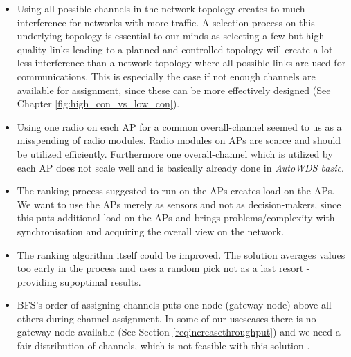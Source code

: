     \begin{itemize}
      \item Using all possible channels in the network topology creates to much interference for networks with more traffic.
	A selection process on this underlying topology is essential to our minds as selecting a few but high quality links
	leading to a planned and controlled topology will create a lot less interference than a network topology where all possible 
	links are used for communications. This is especially the case if not enough channels are available for assignment, since 
	these can be more effectively designed (See Chapter \ref{fig:high_con_vs_low_con}).
	\label{topologypreservingdealbreaker}
	
      \item Using one radio on each \ac{AP} for a common overall-channel seemed to us as a misspending of radio modules.
	Radio modules on APs are scarce and should be utilized efficiently. 
	Furthermore one overall-channel which is utilized by each \ac{AP} does not scale well and is basically already done in \textit{AutoWDS basic}.
	
      \item The ranking process suggested to run on the APs creates load on the APs.
	We want to use the APs merely as sensors and not as decision-makers, 
	since this puts additional load on the APs and brings problems/complexity with synchronisation and
	acquiring the overall view on the network.
	
      \item The ranking algorithm itself could be improved. 
	The solution averages values too early in the process and uses a random pick not as a last resort - providing supoptimal results.
	
      \item \ac{BFS}'s order of assigning channels puts one node (gateway-node) above all others during channel assignment.
	In some of our usescases there is no gateway node available (See Section \ref{reqincreasethroughput}) and we need a fair distribution of channels, 
	which is not feasible with this solution \cite{overview_caa}.
    \end{itemize}

